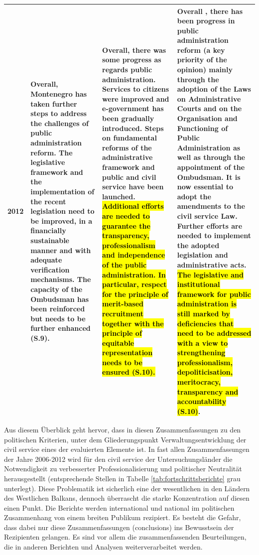 \begin{footnotesize}
\begin{longtable}[H]{|p{1cm}|L{49mm}|L{44mm}|L{43mm}|}
2012&
Overall, Montenegro has taken further steps to address the challenges of public administration reform. The legislative framework and the implementation of the recent legislation need to be improved, in a financially sustainable manner and with adequate verification mechanisms. The capacity of the Ombudsman has been reinforced but needs to be further enhanced (S.9). &
Overall, there was some progress as regards public administration. Services to citizens were improved and e-government has been gradually introduced. Steps on fundamental reforms of the administrative framework and public and civil service have been launched. \hl{Additional efforts are needed to guarantee the transparency, professionalism and independence of the public administration. In particular, respect for the principle of merit-based recruitment together with the principle of equitable representation needs to be ensured (S.10).}&
Overall , there has been progress in public administration reform (a key priority of the opinion) mainly through the adoption of the Laws on Administrative Courts and on the Organisation and Functioning of Public Administration as well as through the appointment of the Ombudsman. It is now essential to adopt the amendments to the civil service Law. Further efforts are needed to implement the adopted legislation and administrative acts. \hl{The legislative and institutional framework for public administration is still marked by deficiencies that need to be addressed with a view to strengthening professionalism, depoliticisation, meritocracy, transparency and accountability (S.10)}.\\\hline
\end{longtable}
\end{footnotesize}
\par
Aus diesem Überblick geht hervor, dass in diesen Zusammenfassungen zu den politischen Kriterien, unter dem Gliederungspunkt Verwaltungsentwicklung der civil service eines der evaluierten Elemente ist. In fast allen Zusammenfassungen der Jahre 2006-2012 wird für den civil service der Untersuchungsländer die Notwendigkeit zu verbesserter Professionalisierung und politischer Neutralität herausgestellt (entsprechende Stellen in Tabelle \ref{tab:fortschrittsberichte} grau unterlegt). Diese Problematik ist sicherlich eine der wesentlichen in den Ländern des Westlichen Balkans, dennoch überrascht die starke Konzentration auf diesen einen Punkt. Die Berichte werden international und national im politischen Zusammenhang von einem breiten Publikum rezipiert. Es besteht die Gefahr, dass dabei nur diese Zusammenfassungen (conclusions) ins Bewusstsein der Rezipienten gelangen. Es sind vor allem die zusammenfassenden Beurteilungen, die in anderen Berichten und Analysen weiterverarbeitet werden.


